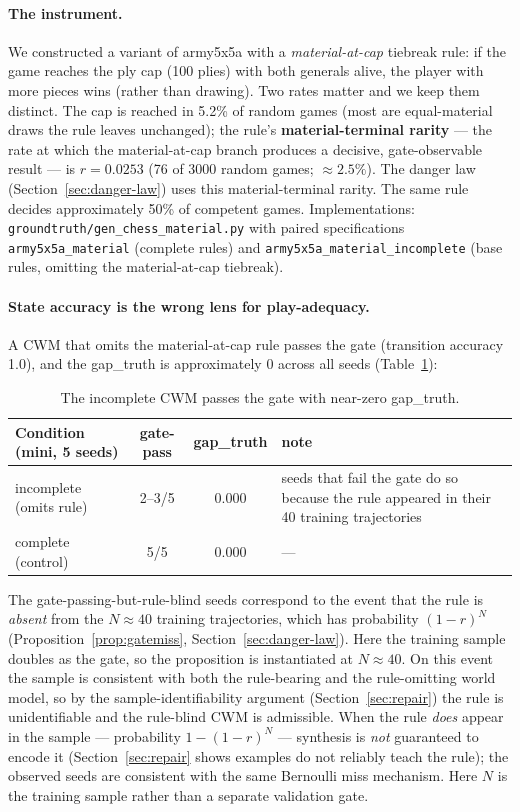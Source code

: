 \documentclass[11pt]{article}
\theoremstyle{remark}
\begin{document}
\paragraph{The instrument.} We constructed a variant of army5x5a with a \emph{material-at-cap} tiebreak rule: if the game reaches the ply cap (100 plies) with both generals alive, the player with more pieces wins (rather than drawing). Two rates matter and we keep them distinct. The cap is reached in 5.2\% of random games (most are equal-material draws the rule leaves unchanged); the rule's \textbf{material-terminal rarity} --- the rate at which the material-at-cap branch produces a decisive, gate-observable result --- is $r = 0.0253$ (76 of 3000 random games; $\approx 2.5\%$). The danger law (Section~\ref{sec:danger-law}) uses this material-terminal rarity. The same rule decides approximately 50\% of competent games. Implementations: \texttt{groundtruth/gen\_chess\_material.py} with paired specifications \texttt{army5x5a\_material} (complete rules) and \texttt{army5x5a\_material\_incomplete} (base rules, omitting the material-at-cap tiebreak).

\paragraph{State accuracy is the wrong lens for play-adequacy.} A CWM that omits the material-at-cap rule passes the gate (transition accuracy 1.0), and the gap\_truth is approximately 0 across all seeds (Table~\ref{tab:gatepass}):

\begin{table}[ht]
\centering
\small
\begin{tabular}{lccp{6cm}}
\toprule
Condition (mini, 5 seeds) & gate-pass & gap\_truth & note \\
\midrule
incomplete (omits rule) & 2--3/5 & 0.000 & seeds that fail the gate do so because the rule appeared in their 40 training trajectories \\
complete (control)      & 5/5    & 0.000 & --- \\
\bottomrule
\end{tabular}
\caption{The incomplete CWM passes the gate with near-zero gap\_truth.}
\label{tab:gatepass}
\end{table}

The gate-passing-but-rule-blind seeds correspond to the event that the rule is \emph{absent} from the $N \approx 40$ training trajectories, which has probability $(1-r)^N$ (Proposition~\ref{prop:gatemiss}, Section~\ref{sec:danger-law}). Here the training sample doubles as the gate, so the proposition is instantiated at $N \approx 40$. On this event the sample is consistent with both the rule-bearing and the rule-omitting world model, so by the sample-identifiability argument (Section~\ref{sec:repair}) the rule is unidentifiable and the rule-blind CWM is admissible. When the rule \emph{does} appear in the sample --- probability $1-(1-r)^N$ --- synthesis is \emph{not} guaranteed to encode it (Section~\ref{sec:repair} shows examples do not reliably teach the rule); the observed seeds are consistent with the same Bernoulli miss mechanism. Here $N$ is the training sample rather than a separate validation gate.
\end{document}
